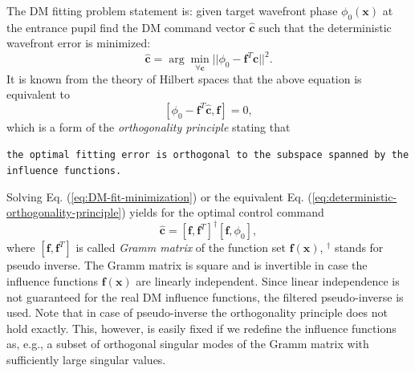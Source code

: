 The DM fitting problem statement is:
given target wavefront phase $\phi_{0}(\bm{x})$ at the entrance pupil find the
DM command vector $\hat{\bm{c}}$ such that the deterministic wavefront error
is minimized:
\begin{equation} \label{eq:DM-fit-minimization}
	\hat{\bm{c}} = \arg \min_{\forall \bm{c}}
	||\phi_{0} - \bm{f}^{T} \bm{c}||^{2}.
\end{equation}
It is known from the theory of Hilbert spaces that the above equation is
equivalent to
\begin{equation} \label{eq:deterministic-orthogonality-principle}
	[\phi_{0} - \bm{f}^{T} \hat{\bm{c}}, \bm{f}] = 0,
\end{equation}
which is a form of the \emph{orthogonality principle} stating that
\begin{flushleft}
	\texttt{the optimal fitting error is orthogonal to the subspace spanned by
	the influence functions.}
\end{flushleft}
Solving Eq. (\ref{eq:DM-fit-minimization}) or the equivalent Eq.
(\ref{eq:deterministic-orthogonality-principle}) yields for the optimal
control command
\begin{equation} \label{eq:fitting-commands}
	\hat{\bm{c}} = [\bm{f},\bm{f}^{T}]^{\dagger} [\bm{f},\phi_{0}],
\end{equation}
where $[\bm{f},\bm{f}^{T}]$ is called \emph{Gramm matrix} of the function set
$\bm{f}(\bm{x})$, $^{\dagger}$ stands for pseudo inverse. The Gramm matrix is
square and is invertible in case the influence functions $\bm{f} (\bm{x})$ are
linearly independent. Since linear independence is not guaranteed for the real
DM influence functions, the filtered pseudo-inverse is used. Note that in case
of pseudo-inverse the orthogonality principle does not hold exactly. This,
however, is easily fixed if we redefine the influence functions as, e.g., a
subset of orthogonal singular modes of the Gramm matrix with sufficiently large
singular values.

